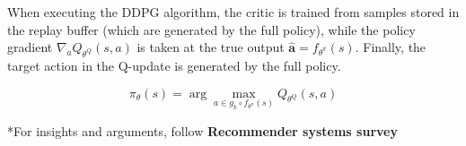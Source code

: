 When executing the DDPG algorithm, the critic is trained from samples stored in the replay buffer (which are generated by the full policy), while the policy gradient $\nabla_a Q_{\theta^Q}(s,a)$ is taken at the true output $\hat{\mathbf{a}} = f_{\theta^{\pi}}(s)$. Finally, the target action in the Q-update is generated by the full policy.

\begin{equation}
\label{eq:qDDPG}
\pi_{\theta}(s) = \arg\max_{a \in g_k \circ f_{\theta^{\pi}}(s) } Q_{\theta^Q}(s, a)
\end{equation}



*For insights and arguments, follow \textbf{Recommender systems survey}

%
%
%
